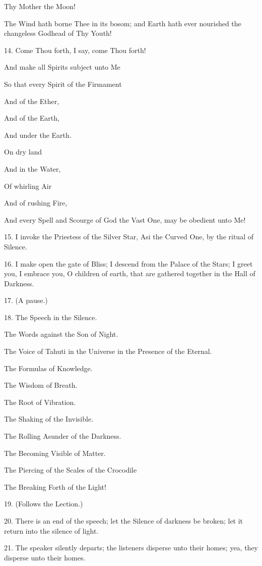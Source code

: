 Thy Mother the Moon!

The Wind hath borne Thee in its bosom; and Earth hath ever nourished the changeless Godhead of Thy Youth!

14. Come Thou forth, I say, come Thou forth!

And make all Spirits subject unto Me

So that every Spirit of the Firmament

And of the Ether,

And of the Earth,

And under the Earth.

On dry land

And in the Water,

Of whirling Air

And of rushing Fire,

And every Spell and Scourge of God the Vast One, may be obedient unto Me!

15. I invoke the Priestess of the Silver Star, Asi the Curved One, by the ritual of Silence.

16. I make open the gate of Bliss; I descend from the Palace of the Stars; I greet you, I embrace you, O children of earth, that are gathered together in the Hall of Darkness.

17. (A pause.)

18. The Speech in the Silence.

The Words against the Son of Night.

The Voice of Tahuti in the Universe in the Presence of the Eternal.

The Formulas of Knowledge.

The Wisdom of Breath.

The Root of Vibration.

The Shaking of the Invisible.

The Rolling Asunder of the Darkness.

The Becoming Visible of Matter.

The Piercing of the Scales of the Crocodile

The Breaking Forth of the Light!

19. (Follows the Lection.)

20. There is an end of the speech; let the Silence of darkness be broken; let it return into the silence of light.

21. The speaker silently departs; the listeners disperse unto their homes; yea, they disperse unto their homes.
